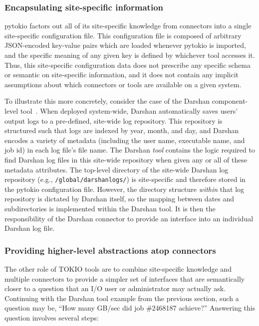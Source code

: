\subsubsection{Encapsulating site-specific information}

pytokio factors out all of its site-specific knowledge from connectors into a single site-specific configuration file.
This configuration file is composed of arbitrary JSON-encoded key-value pairs which are loaded whenever pytokio is imported, and the specific meaning of any given key is defined by whichever tool accesses it.
Thus, this site-specific configuration data does not prescribe any specific schema or semantic on site-specific information, and it does not contain any implicit assumptions about which connectors or tools are available on a given system.

To illustrate this more concretely, consider the case of the Darshan component-level tool~\cite{Carns2009}.
When deployed system-wide, Darshan automatically saves users' output logs to a pre-defined, site-wide log repository.
This repository is structured such that logs are indexed by year, month, and day, and Darshan encodes a variety of metadata (including the user name, executable name, and job id) in each log file's file name.
The Darshan \emph{tool} contains the logic required to find Darshan log files in this site-wide repository when given any or all of these metadata attributes.
The top-level directory of the site-wide Darshan log repository (e.g., \texttt{{/global/darshanlogs/}}) is site-specific and therefore stored in the pytokio configuration file.
However, the directory structure \emph{within} that log repository is dictated by Darshan itself, so the mapping between dates and subdirectories is implemented within the Darshan tool.
It is then the responsibility of the Darshan connector to provide an interface into an individual Darshan log file.

\subsubsection{Providing higher-level abstractions atop connectors}

The other role of TOKIO tools are to combine site-specific knowledge and multiple connectors to provide a simpler set of interfaces that are semantically closer to a question that an I/O user or administrator may actually ask.
Continuing with the Darshan tool example from the previous section, such a question may be, ``How many GB/sec did job \#2468187 achieve?''
Answering this question involves several steps:

